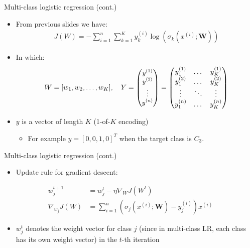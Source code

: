 \documentclass[serif, aspectratio=169]{beamer}
\begin{document}
    \begin{frame}{Multi-class logistic regression (cont.)}
        \begin{itemize}
            \item From previous slides we have:
            \begin{align*}
                J(W) = -\sum_{i=1}^{n}\sum_{k=1}^{K}y_k^{(i)} \log (\sigma _k(x^{(i)}; \mathbf{W}))
            \end{align*}
            \item In which:
            \[
                W = [w_1,w_2, \dots, w_K], \quad Y =
                \text{\small $
                \begin{pmatrix}
                    y^{(1)} \\
                    y^{(2)} \\
                    \vdots \\
                    y^{(n)}
                \end{pmatrix}
                $}
                =
                \begin{pmatrix}
                    y_1^{(1)} & \dots & y_K^{(1)} \\
                    y_1^{(2)} & \dots & y_K^{(2)} \\
                    \vdots    & \ddots & \vdots \\
                    y_1^{(n)} & \dots & y_K^{(n)}
                \end{pmatrix}
            \]

            \item $y$ is a vector of length $K$ (1-of-$K$ encoding)
            \begin{itemize}
                \item For example $y=[0,0,1,0]^T$ when the target class is $C_3$.
            \end{itemize}
        \end{itemize}
    \end{frame}
    \begin{frame}{Multi-class logistic regression (cont.)}
        \begin{itemize}
            \item Update rule for gradient descent:

        \end{itemize}
        \begin{align*}
            w_j^{t+1} &= w_j^t - \eta \nabla _W J(W^t) \\
            \nabla _{w_{j}} J(W) &= \sum_{i=1}^{n} (\sigma _j(x^{(i)}; \mathbf{W}) - y_j^{(i)})x^{(i)}
        \end{align*}

        \begin{itemize}
            \item $w_j^t$ denotes the weight vector for class $j$ (since in multi-class LR, each class has its own weight vector) in the $t$-th iteration
        \end{itemize}
    \end{frame}
\end{document}
